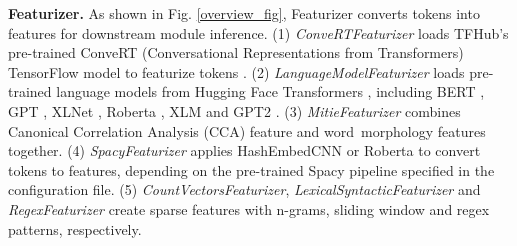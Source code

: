 \textbf{Featurizer.} As shown in Fig. \ref{overview_fig}, Featurizer converts tokens into features for downstream module inference. (1) \textit{ConveRTFeaturizer} loads TFHub's \cite{TensorHub} pre-trained ConveRT (Conversational Representations from Transformers) TensorFlow model  to featurize tokens \cite{henderson2019convert}. (2) \textit{LanguageModelFeaturizer} loads pre-trained language models from Hugging Face Transformers \cite{transformers}, including BERT \cite{devlin2018bert}, GPT \cite{hu2020gpt}, XLNet \cite{yang2019xlnet}, Roberta \cite{liu2019roberta}, XLM \cite{xlm} and GPT2 \cite{gpt2}.
(3) \textit{MitieFeaturizer} combines Canonical Correlation Analysis (CCA) feature and word~morphology features together. (4) \textit{SpacyFeaturizer} applies HashEmbedCNN or Roberta to convert tokens to features, depending on the pre-trained Spacy pipeline specified in the configuration file.
(5) \textit{CountVectorsFeaturizer}, \textit{LexicalSyntacticFeaturizer} and \textit{RegexFeaturizer} create sparse features with n-grams, sliding window and regex patterns,  respectively. 



